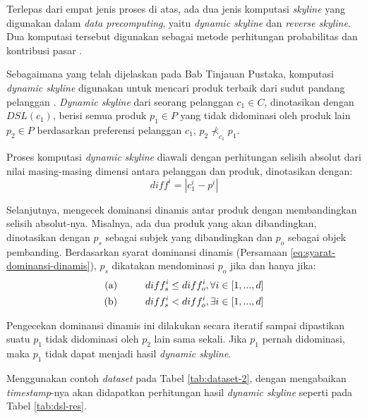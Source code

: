 Terlepas dari empat jenis proses di atas, ada dua jenis komputasi \textit{skyline} yang digunakan dalam \textit{data precomputing}, yaitu \textit{dynamic skyline} dan \textit{reverse skyline}. Dua komputasi tersebut digunakan sebagai metode perhitungan probabilitas dan kontribusi pasar \cite{kmpp}. 


Sebagaimana yang telah dijelaskan pada Bab Tinjauan Pustaka, komputasi \textit{dynamic skyline} digunakan untuk mencari produk terbaik dari sudut pandang pelanggan \cite{kmpp}. \textit{Dynamic skyline} \cite{dynamic-skyline} dari seorang pelanggan $c_1 \in C$, dinotasikan dengan $DSL(c_1)$, berisi semua produk $p_1 \in P$ yang tidak didominasi oleh produk lain $p_2 \in P$ berdasarkan preferensi pelanggan $c_1$, $p_2 \nprec_{c_1} p_1$. 

Proses komputasi \textit{dynamic skyline} diawali dengan perhitungan selisih absolut dari nilai masing-masing dimensi antara pelanggan dan produk, dinotasikan dengan:
\begin{equation}\label{eq:diff}
diff^i = |c_1^i - p^i|
\end{equation}

Selanjutnya, mengecek dominansi dinamis antar produk dengan membandingkan selisih absolut-nya. Misalnya, ada dua produk yang akan dibandingkan, dinotasikan dengan $p_s$ sebagai subjek yang dibandingkan dan $p_o$ sebagai objek pembanding. Berdasarkan syarat dominansi dinamis (Persamaan \ref{eq:syarat-dominansi-dinamis}), $p_s$ dikatakan mendominasi $p_o$ jika dan hanya jika:
\begin{equation}\label{eq:komputasi-dsl}
\begin{split}
\text{(a)} \hspace*{1cm} diff_s^i \leq diff_o^i, \forall i \in [1, ..., d] \\
\text{(b)} \hspace*{1cm} diff_s^i < diff_o^i, \exists i \in [1, ..., d]
\end{split}
\end{equation}

Pengecekan dominansi dinamis ini dilakukan secara iteratif sampai dipastikan suatu $p_1$ tidak didominasi oleh $p_2$ lain sama sekali. Jika $p_1$ pernah didominasi, maka $p_1$ tidak dapat menjadi hasil \textit{dynamic skyline}.

Menggunakan contoh \textit{dataset} pada Tabel \ref{tab:dataset-2}, dengan mengabaikan \textit{timestamp}-nya akan didapatkan perhitungan hasil \textit{dynamic skyline} seperti pada Tabel \ref{tab:dsl-res}.

